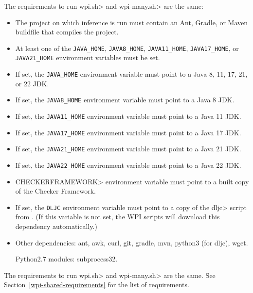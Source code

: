 
The requirements to run \<wpi.sh> and \<wpi-many.sh> are the same:

\begin{itemize}
\item The project on which inference is run must contain an Ant, Gradle,
  or Maven buildfile that compiles the project.
\item At least one of the \verb|JAVA_HOME|,
  \verb|JAVA8_HOME|, \verb|JAVA11_HOME|, \verb|JAVA17_HOME|, or \verb|JAVA21_HOME|
  environment variables must be set.
\item If set, the \verb|JAVA_HOME| environment variable must point to a
  Java 8, 11, 17, 21, or 22 JDK.
\item If set, the \verb|JAVA8_HOME| environment variable must point to a Java 8 JDK.
\item If set, the \verb|JAVA11_HOME| environment variable must point to a Java 11 JDK.
\item If set, the \verb|JAVA17_HOME| environment variable must point to a Java 17 JDK.
\item If set, the \verb|JAVA21_HOME| environment variable must point to a Java 21 JDK.
\item If set, the \verb|JAVA22_HOME| environment variable must point to a Java 22 JDK.
\item \<CHECKERFRAMEWORK> environment variable must point to a built copy of the Checker Framework.
\item If set, the \verb|DLJC| environment variable must point to a copy of the \<dljc> script
from . (If this variable is not
set, the WPI scripts will download this dependency automatically.)
\item Other dependencies:
  ant,
  awk,
  curl,
  git,
  gradle,
  mvn,
  python3 (for dljc),
  wget.

  Python2.7 modules:
  subprocess32.
\end{itemize}




The requirements to run \<wpi.sh> and \<wpi-many.sh> are the same. See Section~\ref{wpi-shared-requirements}
for the list of requirements.

